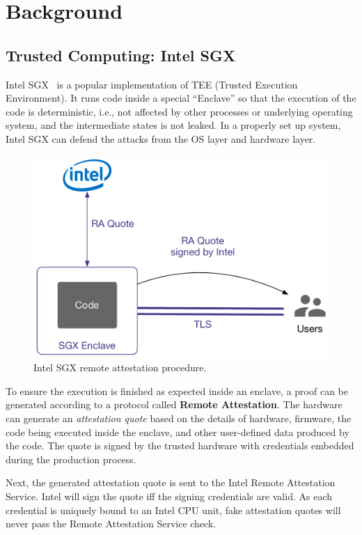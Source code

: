 \section{Background}

\subsection{Trusted Computing: Intel SGX}

Intel SGX~\cite{sgxdoc} is a popular implementation of TEE (Trusted Execution Environment). It runs code inside a special ``Enclave'' so that the execution of the code is deterministic, i.e., not affected by other processes or underlying operating system, and the intermediate states is not leaked. In a properly set up system, Intel SGX can defend the attacks from the OS layer and hardware layer.

\begin{figure}
    \centering \footnotesize
    \includegraphics[width=.7\columnwidth]{img/pLIBRA-sgxra}
    \caption{Intel SGX remote attestation procedure.}
    \label{fig:sgx-ra}
\end{figure}

To ensure the execution is finished as expected inside an enclave, a proof can be generated according to a protocol called \textbf{Remote Attestation}. The hardware can generate an \textit{attestation quote} based on the details of hardware, firmware, the code being executed inside the enclave, and other user-defined data produced by the code. The quote is signed by the trusted hardware with credentials embedded during the production process.

Next, the generated attestation quote is sent to the Intel Remote Attestation Service. Intel will sign the quote iff the signing credentials are valid. As each credential is uniquely bound to an Intel CPU unit, fake attestation quotes will never pass the Remote Attestation Service check.

